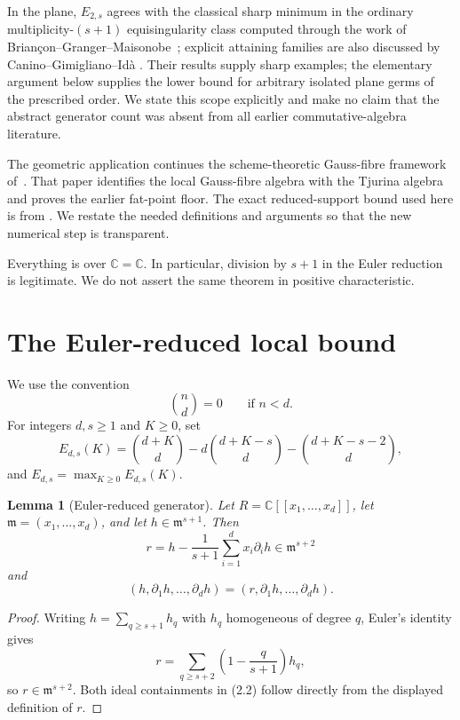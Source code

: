 \documentclass[11pt,a4paper]{article}
\newtheorem{lemma}[theorem]{Lemma}
\theoremstyle{definition}
\numberwithin{equation}{section}
\newcommand{\kk}{\mathbb C}
\newcommand{\m}{\mathfrak m}
\begin{document}
In the plane, \(E_{2,s}\) agrees with the classical sharp minimum in the
ordinary multiplicity-\((s+1)\) equisingularity class computed through the
work of Brian\c{c}on--Granger--Maisonobe~\cite{BGM1988}; explicit attaining
families are also discussed by Canino--Gimigliano--Id\`a
\cite{CaninoEtAl2025,CaninoEtAlArxiv}.  Their results supply sharp examples;
the elementary argument below supplies the lower bound for arbitrary
isolated plane germs of the prescribed order.  We state this scope
explicitly and make no claim that the abstract generator count was absent
from all earlier commutative-algebra literature.

The geometric application continues the scheme-theoretic Gauss-fibre
framework of~\cite{ErikssonGauss2026}.  That paper identifies the local
Gauss-fibre algebra with the Tjurina algebra and proves the earlier
fat-point floor.  The exact reduced-support bound used here is from
\cite{ErikssonDual2026,ErikssonTangent2026}.  We restate the needed
definitions and arguments so that the new numerical step is transparent.

Everything is over \(\kk=\mathbb C\).  In particular, division by \(s+1\)
in the Euler reduction is legitimate.  We do not assert the same theorem in
positive characteristic.

\section{The Euler-reduced local bound}

We use the convention
\[
 \binom nd=0\qquad\text{if }n<d.
\]
For integers \(d,s\ge1\) and \(K\ge0\), set
\begin{equation}
 E_{d,s}(K)=
 \binom{d+K}{d}
 -d\binom{d+K-s}{d}
 -\binom{d+K-s-2}{d},
\end{equation}
and \(E_{d,s}=\max_{K\ge0}E_{d,s}(K)\).

\begin{lemma}[Euler-reduced generator]\label{lem:euler}
Let \(R=\kk[[x_1,\ldots,x_d]]\), let
\(\m=(x_1,\ldots,x_d)\), and let \(h\in\m^{s+1}\).  Then
\[
 r=h-\frac1{s+1}\sum_{i=1}^d x_i\partial_i h
 \in\m^{s+2}
\]
and
\[
 (h,\partial_1h,\ldots,\partial_dh)
 =(r,\partial_1h,\ldots,\partial_dh).
\]
\end{lemma}

\begin{proof}
Writing \(h=\sum_{q\ge s+1}h_q\) with \(h_q\) homogeneous of degree \(q\),
Euler's identity gives
\[
 r=\sum_{q\ge s+2}\left(1-\frac{q}{s+1}\right)h_q,
\]
so \(r\in\m^{s+2}\).  Both ideal containments in (2.2) follow directly
from the displayed definition of \(r\).
\end{proof}
\end{document}
